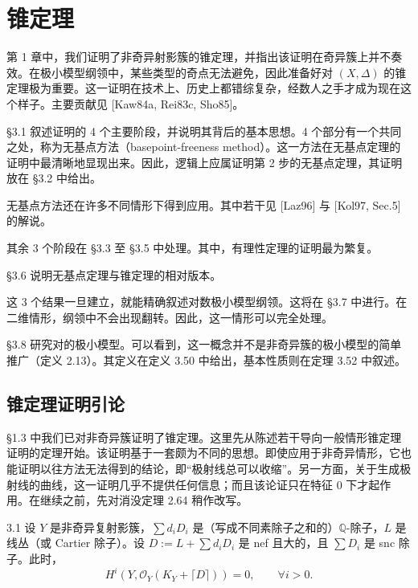 \chapter{锥定理}

第 1 章中，我们证明了非奇异射影簇的锥定理，并指出该证明在奇异簇上并不奏效。在极小模型纲领中，某些类型的奇点无法避免，因此准备好对 $(X,\Delta)$ 的锥定理极为重要。这一证明在技术上、历史上都错综复杂，经数人之手才成为现在这个样子。主要贡献见 [Kaw84a, Rei83c, Sho85]。

§3.1 叙述证明的 4 个主要阶段，并说明其背后的基本思想。4 个部分有一个共同之处，称为无基点方法（basepoint-freeness method）。这一方法在无基点定理的证明中最清晰地显现出来。因此，逻辑上应属证明第 2 步的无基点定理，其证明放在 §3.2 中给出。

无基点方法还在许多不同情形下得到应用。其中若干见 [Laz96] 与 [Kol97, Sec.5] 的解说。

其余 3 个阶段在 §3.3 至 §3.5 中处理。其中，有理性定理的证明最为繁复。

§3.6 说明无基点定理与锥定理的相对版本。

这 3 个结果一旦建立，就能精确叙述对数极小模型纲领。这将在 §3.7 中进行。在二维情形，纲领中不会出现翻转。因此，这一情形可以完全处理。

§3.8 研究对的极小模型。可以看到，这一概念并不是非奇异簇的极小模型的简单推广（定义 2.13）。其定义在定义 3.50 中给出，基本性质则在定理 3.52 中叙述。

\section{锥定理证明引论}

§1.3 中我们已对非奇异簇证明了锥定理。这里先从陈述若干导向一般情形锥定理证明的定理开始。该证明基于一套颇为不同的思想。即使应用于非奇异情形，它也能证明以往方法无法得到的结论，即“极射线总可以收缩”。另一方面，关于生成极射线的曲线，这一证明几乎不提供任何信息；而且该论证只在特征 0 下才起作用。在继续之前，先对消没定理 2.64 稍作改写。

\begin{theorem}{3.1}
设 $Y$ 是非奇异复射影簇，$\sum d_iD_i$ 是（写成不同素除子之和的）$\mathbb{Q}$-除子，$L$ 是线丛（或 Cartier 除子）。设 $D:=L+\sum d_iD_i$ 是 nef 且大的，且 $\sum D_i$ 是 snc 除子。此时，
\[
H^i(Y,\mathcal{O}_Y(K_Y+\lceil D\rceil))=0,\qquad \forall i>0.
\]
\end{theorem}

